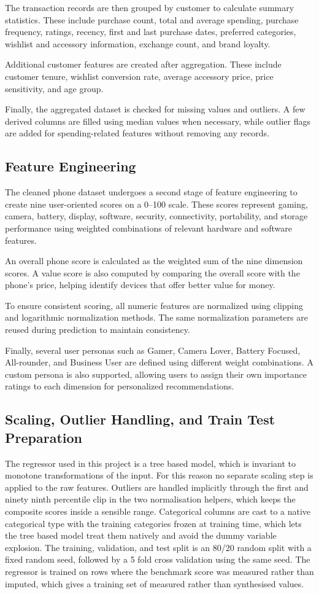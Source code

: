 \documentclass[12pt, a4paper]{report}
\numberwithin{figure}{chapter}
\numberwithin{table}{chapter}
\numberwithin{equation}{chapter}
\begin{document}
The transaction records are then grouped by customer to calculate summary statistics. These include purchase count, total and average spending, purchase frequency, ratings, recency, first and last purchase dates, preferred categories, wishlist and accessory information, exchange count, and brand loyalty.

Additional customer features are created after aggregation. These include customer tenure, wishlist conversion rate, average accessory price, price sensitivity, and age group.

Finally, the aggregated dataset is checked for missing values and outliers. A few derived columns are filled using median values when necessary, while outlier flags are added for spending-related features without removing any records.
\subsection{Feature Engineering}
The cleaned phone dataset undergoes a second stage of feature engineering to create nine user-oriented scores on a 0–100 scale. These scores represent gaming, camera, battery, display, software, security, connectivity, portability, and storage performance using weighted combinations of relevant hardware and software features.

An overall phone score is calculated as the weighted sum of the nine dimension scores. A value score is also computed by comparing the overall score with the phone's price, helping identify devices that offer better value for money.

To ensure consistent scoring, all numeric features are normalized using clipping and logarithmic normalization methods. The same normalization parameters are reused during prediction to maintain consistency.

Finally, several user personas such as Gamer, Camera Lover, Battery Focused, All-rounder, and Business User are defined using different weight combinations. A custom persona is also supported, allowing users to assign their own importance ratings to each dimension for personalized recommendations.
\subsection{Scaling, Outlier Handling, and Train Test Preparation}

The regressor used in this project is a tree based model, which is invariant to monotone transformations of the input. For this reason no separate scaling step is applied to the raw features. Outliers are handled implicitly through the first and ninety ninth percentile clip in the two normalisation helpers, which keeps the composite scores inside a sensible range. Categorical columns are cast to a native categorical type with the training categories frozen at training time, which lets the tree based model treat them natively and avoid the dummy variable explosion. The training, validation, and test split is an 80/20 random split with a fixed random seed, followed by a 5 fold cross validation using the same seed. The regressor is trained on rows where the benchmark score was measured rather than imputed, which gives a training set of measured rather than synthesised values.
\end{document}
